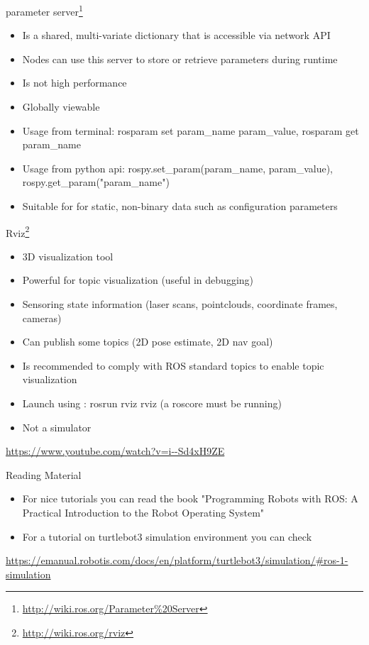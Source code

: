 \documentclass{beamer}
\begin{document}
\begin{frame}{parameter server\footnote{\url{http://wiki.ros.org/Parameter\%20Server}}}
	\begin{itemize}
		\item Is a shared, multi-variate dictionary that is accessible via network API
		\item Nodes can use this server to store or retrieve parameters during runtime
		\item Is not high performance
		\item Globally viewable
		\item Usage from terminal: rosparam set param\_name param\_value, rosparam get param\_name
		\item Usage from python api: rospy.set\_param(param\_name, param\_value), rospy.get\_param("param\_name")
		\item Suitable for for static, non-binary data such as configuration parameters
	\end{itemize}
	
\end{frame}


\begin{frame}{Rviz\footnote{\url{http://wiki.ros.org/rviz}}}
	
	\begin{itemize}
		\item 3D visualization tool
		\item Powerful for topic visualization (useful in debugging)
		\item Sensoring state information (laser scans, pointclouds, coordinate frames, cameras)
		\item Can publish some topics (2D pose estimate, 2D nav goal)
		\item Is recommended to comply with ROS standard topics to enable topic visualization
		\item Launch using : rosrun rviz rviz (a roscore must be running)
		\item Not a simulator
	\end{itemize}
	
	\centering
	\url{https://www.youtube.com/watch?v=i--Sd4xH9ZE}
	
\end{frame}


\begin{frame}{Reading Material}
	
	\begin{itemize}
		\item For nice tutorials you can read the book "Programming Robots with ROS: A Practical Introduction to the Robot Operating System"
		\item For a tutorial on turtlebot3 simulation environment you can check 
	\end{itemize}
	\centering
	\url{https://emanual.robotis.com/docs/en/platform/turtlebot3/simulation/#ros-1-simulation}
	
\end{frame}
\end{document}

